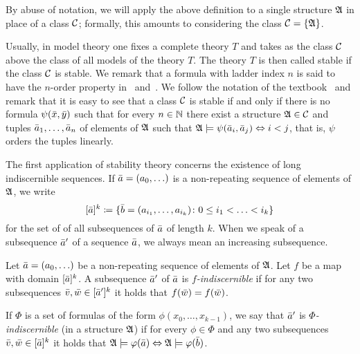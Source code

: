 By abuse of notation, we will apply the above definition to a single structure $\mathfrak{A}$ in place of a class $\cal C$; formally, this amounts to considering the class $\cal C=\{\mathfrak{A}\}$.


Usually, in model theory one fixes a complete theory $T$
and takes as the class $\cal C$ above the class of all models of the theory $T$. The theory $T$ is then called stable if the class $\cal C$ is stable.
We remark that a formula with ladder index $n$ is said to have the
$n$-order property in~\cite{adler2014interpreting} and~\cite{ensley1996finite}.
We follow the notation of the textbook~\cite{hodges1993model} and remark
that it is easy to see that a class $\mathcal{C}$ is stable if and only if there is no 
formula $\psi(\bar{x},\bar{y})$ such that for every $n\in \mathbb{N}$
there exist a structure $\mathfrak{A}\in \mathcal{C}$ and tuples $\bar{a}_1,\ldots, \bar{a}_{n}$
of elements of $\mathfrak{A}$ such that $\mathfrak{A}\models\psi(\bar{a}_i,\bar{a}_j)\Leftrightarrow i<j$,
that is, $\psi$ orders the tuples linearly. 

The first application of stability theory concerns the existence of long
indiscernible sequences. If $\bar{a}=(a_0,\ldots)$ is a non-repeating sequence of elements of $\mathfrak{A}$, we write \[[\bar{a}]^k\coloneqq \{\bar{b}=(a_{i_1},\ldots, a_{i_k}) \colon 0\leq i_1<\ldots <i_k\}\] for the set of of all subsequences
of $\bar{a}$ of length $k$. When we speak of a subsequence $\bar{a}'$
of a sequence $\bar{a}$, we always mean an increasing subsequence. 

\begin{definition}
Let $\bar{a}=(a_0,\ldots)$ be a non-repeating sequence of elements of $\mathfrak{A}$.
Let $f$ be a map with domain $[\bar{a}]^k$. A subsequence $\bar{a}'$ 
of $\bar{a}$ is \emph{$f$-indiscernible} if for any two 
subsequences $\bar{v},\bar{w}\in [\bar{a}']^k$ 
it holds that $f(\bar{w})=f(\bar{w})$.

If $\Phi$ is a set of formulas of the form $\phi(x_0,\ldots, x_{k-1})$, 
we say that $\bar{a}'$ 
is \emph{$\Phi$-indiscernible} (in a structure $\mathfrak{A}$)
if for every $\phi\in \Phi$ and any two 
subsequences $\bar{v},\bar{w}\in [\bar{a}]^k$ it
holds that $\mathfrak{A}\models\varphi(\bar{a})\Leftrightarrow\mathfrak{A}\models\varphi(\bar{b})$. 
\end{definition}


